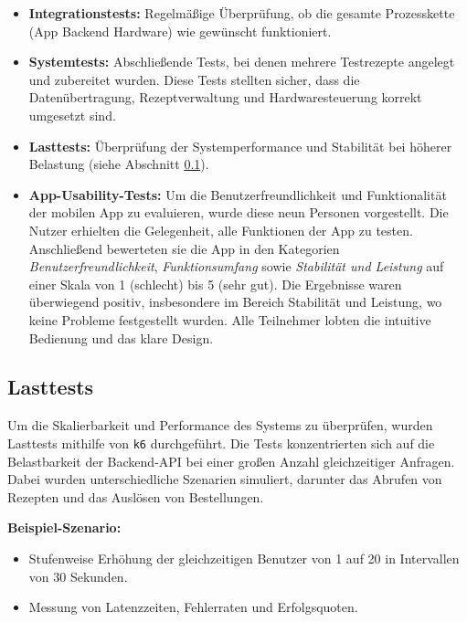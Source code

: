 \begin{itemize}
  \item \textbf{Integrationstests:} Regelmäßige Überprüfung, ob die gesamte Prozesskette 
    (App \textrightarrow{} Backend \textrightarrow{} Hardware) wie gewünscht funktioniert.
  \item \textbf{Systemtests:} Abschließende Tests, bei denen mehrere Testrezepte angelegt und 
    zubereitet wurden. Diese Tests stellten sicher, dass die Datenübertragung, Rezeptverwaltung und 
    Hardwaresteuerung korrekt umgesetzt sind.
  \item \textbf{Lasttests:} Überprüfung der Systemperformance und Stabilität bei höherer Belastung 
    (siehe Abschnitt \ref{subsec:lasttests}).
  \item \textbf{App-Usability-Tests:} Um die Benutzerfreundlichkeit und Funktionalität der mobilen 
    App zu evaluieren, wurde diese neun Personen vorgestellt. Die Nutzer erhielten die Gelegenheit, 
    alle Funktionen der App zu testen. Anschließend bewerteten sie die App in den Kategorien 
    \textit{Benutzerfreundlichkeit}, \textit{Funktionsumfang} sowie \textit{Stabilität und Leistung} 
    auf einer Skala von 1 (schlecht) bis 5 (sehr gut). Die Ergebnisse waren überwiegend positiv, 
    insbesondere im Bereich Stabilität und Leistung, wo keine Probleme festgestellt wurden. Alle 
    Teilnehmer lobten die intuitive Bedienung und das klare Design.
\end{itemize}

\subsection{Lasttests}
\label{subsec:lasttests}

Um die Skalierbarkeit und Performance des Systems zu überprüfen, wurden Lasttests mithilfe von 
\texttt{k6} durchgeführt. Die Tests konzentrierten sich auf die Belastbarkeit der Backend-API bei 
einer großen Anzahl gleichzeitiger Anfragen. Dabei wurden unterschiedliche Szenarien simuliert, 
darunter das Abrufen von Rezepten und das Auslösen von Bestellungen.\newline

\textbf{Beispiel-Szenario:}
\begin{itemize}
  \item Stufenweise Erhöhung der gleichzeitigen Benutzer von 1 auf 20 in Intervallen von 30 Sekunden.
  \item Messung von Latenzzeiten, Fehlerraten und Erfolgsquoten.
\end{itemize}

